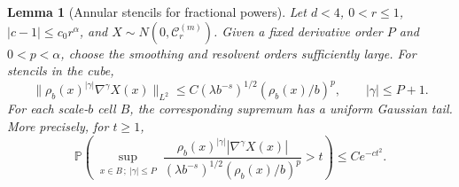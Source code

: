 \documentclass[11pt]{article}
\newtheorem{lemma}[theorem]{Lemma}
\theoremstyle{definition}
\begin{document}
\begin{lemma}[Annular stencils for fractional powers]
\label{lem:fractional-annular-stencils}
Let \(d<4\), \(0<r\le1\), \(|c-1|\le c_0r^\alpha\), and
\(X\sim N(0,\mathcal C_r^{(m)})\). Given a fixed derivative order
\(P\) and \(0<p<\alpha\), choose the smoothing and resolvent orders
sufficiently large. For stencils in the cube,
\begin{equation}
 \|\rho_b(x)^{|\gamma|}\nabla^\gamma X(x)\|_{L^2}
 \le C(\lambda b^{-s})^{1/2}(\rho_b(x)/b)^p,
 \qquad |\gamma|\le P+1 .
\end{equation}
For each scale-\(b\) cell \(B\), the corresponding supremum has
a uniform Gaussian tail. More precisely, for \(t\ge1\),
\begin{equation}
 \mathbb P\!\left(\sup_{\substack{x\in B\,;\ |\gamma|\le P}}
 \frac{\rho_b(x)^{|\gamma|}|\nabla^\gamma X(x)|}
 {(\lambda b^{-s})^{1/2}(\rho_b(x)/b)^p}>t\right)
 \le C e^{-ct^2}.
\end{equation}
\end{lemma}
\end{document}
